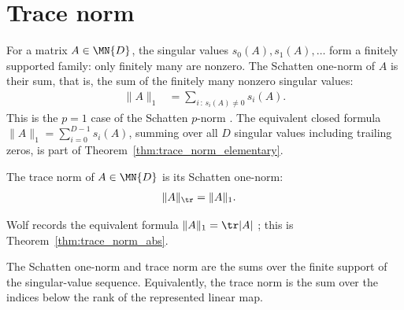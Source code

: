 \section{Trace norm}

\begin{definition}\label{def:schatten_one_norm}
    \leanok
    For a matrix $A\in\MN{D}$, the singular values $s_0(A),s_1(A),\ldots$ form
    a finitely supported family: only finitely many are nonzero. The Schatten
    one-norm of $A$ is their sum, that is, the sum of the finitely many nonzero
    singular values:
    \begin{align}
        \lVert A\rVert_1
         & =\sum_{i\,:\,s_i(A)\neq 0}s_i(A).
        \label{eq:entropy_schatten_one_norm}
    \end{align}
    This is the $p=1$ case of the Schatten $p$-norm
    \cite[Chapter~8, Section~8.1]{Wolf2012Quantum}. The equivalent closed
    formula $\lVert A\rVert_1=\sum_{i=0}^{D-1}s_i(A)$, summing over all $D$
    singular values including trailing zeros, is part of
    Theorem~\ref{thm:trace_norm_elementary}.
\end{definition}

\begin{definition}\label{def:trace_norm}
    \leanok
    The trace norm of $A\in\MN{D}$ is its Schatten one-norm:
    \begin{align}
        \lVert A\rVert_{\tr}
         & =\lVert A\rVert_1.
        \label{eq:entropy_trace_norm}
    \end{align}
\end{definition}

Wolf records the equivalent formula
$\lVert A\rVert_1=\tr\lvert A\rvert$
\cite[Chapter~8, Section~8.1]{Wolf2012Quantum}; this is
Theorem~\ref{thm:trace_norm_abs}.

\begin{theorem}\label{thm:trace_norm_singular_values}
    \leanok
    The Schatten one-norm and trace norm are the sums over the finite support of
    the singular-value sequence. Equivalently, the trace norm is the sum over
    the indices below the rank of the represented linear map.
\end{theorem}


